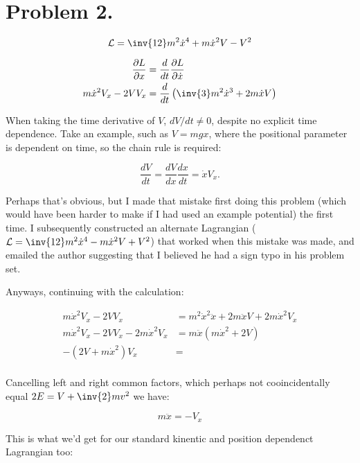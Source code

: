 \documentclass{article}
\newcommand{\LL}[0]{\mathcal{L}}
\newcommand{\xdot}[0]{\dot{x}}
\newcommand{\xddot}[0]{\ddot{x}}
\begin{document}
\section{ Problem 2. }

\begin{equation*}
\LL = \inv{12}m^2 \xdot^4 + m \xdot^2 V - V^2
\end{equation*}

\begin{align*}
\frac{\partial L}{\partial x} &= \frac{d}{dt} \frac{\partial L}{\partial \xdot} \\
m \xdot^2 V_x - 2V V_x &= \frac{d}{dt} \left( \inv{3}m^2 \xdot^3 + 2 m \xdot V \right) \\
\end{align*}

When taking the time derivative of $V$, $dV/dt \ne 0$, despite no explicit time dependence.
Take an example, such as $V = mgx$, where the positional parameter is dependent on time, so the chain rule is required:

\begin{equation*}
\frac{d V}{dt} = \frac{d V}{dx} \frac{dx}{dt} = \xdot V_x.
\end{equation*}

Perhaps that's obvious, but I made that mistake first doing this problem (which would have been harder to make if I had used an example potential) the first time.  I subsequently constructed an alternate Lagrangian 
($\LL = \inv{12}m^2 \xdot^4 - m \xdot^2 V + V^2$)
that worked when this mistake was made, and emailed the author suggesting that I believed he had a sign typo in his problem set.

Anyways, continuing with the calculation:

\begin{align*}
m \xdot^2 V_x - 2V V_x &= m^2 \xdot^2 \xddot + 2m \xddot V + 2 m \xdot^2 V_x \\
m \xdot^2 V_x - 2V V_x - 2 m \xdot^2 V_x &= m \xddot ( m \xdot^2 + 2 V ) \\
- ( 2V + m \xdot^2 ) V_x &= \\
\end{align*}

Cancelling left and right common factors, which perhaps not cooincidentally equal $2E = V + \inv{2}mv^2$ we have:

\begin{equation*}
m \xddot = -V_x
\end{equation*}

This is what we'd get for our standard kinentic and position dependenct Lagrangian too:
\end{document}
